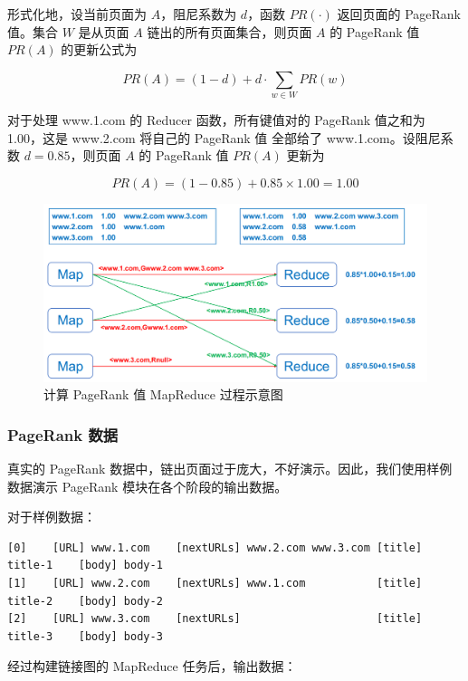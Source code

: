 \documentclass{ctexart}
\begin{document}
    形式化地，设当前页面为 $A$，阻尼系数为 $d$，函数 $PR(\cdot)$ 返回页面的 PageRank 值。集合 $W$ 是从页面 $A$ 链出的所有页面集合，则页面 $A$ 的 PageRank 值 $PR(A)$ 的更新公式为

    $$ PR(A) = (1-d) + d \cdot \sum_{w \in W} PR(w) $$

    对于处理 www.1.com 的 Reducer 函数，所有键值对的 PageRank 值之和为 1.00，这是 www.2.com 将自己的 PageRank 值 全部给了 www.1.com。设阻尼系数 $d=0.85$，则页面 $A$ 的 PageRank 值 $PR(A)$ 更新为

    $$ PR(A) = (1-0.85) + 0.85 \times 1.00 = 1.00 $$

    \begin{figure}[t]
        \centering
        \includegraphics[width=\textwidth]{src/pagerank_calculate}
        \caption{计算 PageRank 值 MapReduce 过程示意图}
        \label{fig:pagerank_calculate}
    \end{figure}

    \subsubsection{PageRank 数据}\label{subsubsec:pagerank}

    真实的 PageRank 数据中，链出页面过于庞大，不好演示。因此，我们使用样例数据演示 PageRank 模块在各个阶段的输出数据。

    对于样例数据：

    \begin{lstlisting}[basicstyle=\ttfamily\footnotesize]
[0]    [URL] www.1.com    [nextURLs] www.2.com www.3.com [title] title-1    [body] body-1
[1]    [URL] www.2.com    [nextURLs] www.1.com           [title] title-2    [body] body-2
[2]    [URL] www.3.com    [nextURLs]                     [title] title-3    [body] body-3
    \end{lstlisting}

    经过构建链接图的 MapReduce 任务后，输出数据：
\end{document}
